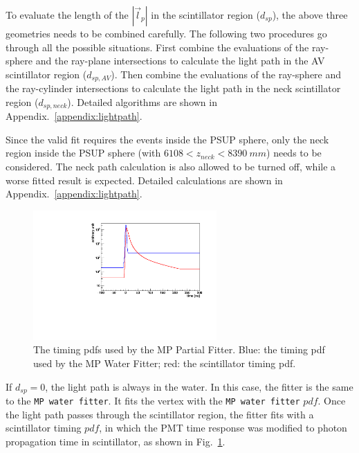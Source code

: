 To evaluate the length of the $|\vec{l}_p|$ in the scintillator region ($d_{sp}$), the above three geometries needs to be combined carefully. The following two procedures go through all the possible situations. First combine the evaluations of the ray-sphere and the ray-plane intersections to calculate the light path in the AV scintillator region ($d_{sp,AV}$). Then combine the evaluations of the ray-sphere and the ray-cylinder intersections to calculate the light path in the neck scintillator region ($d_{sp,neck}$). Detailed algorithms are shown in Appendix.~\ref{appendix:lightpath}.

Since the valid fit requires the events inside the PSUP sphere, only the neck region inside the PSUP sphere (with $6108<z_{neck}<8390~mm$) needs to be considered. The neck path calculation is also allowed to be turned off, while a worse fitted result is expected. Detailed calculations are shown in Appendix.~\ref{appendix:lightpath}.

\begin{figure}[htbp]
	\centering	
	\includegraphics[width=7cm]{scintpdf.pdf}
	\caption{The timing pdfs used by the MP Partial Fitter. Blue: the timing pdf used by the MP Water Fitter; red: the scintillator timing pdf.}
	\label{partialpdf}
\end{figure}

If $d_{sp}=0$, the light path is always in the water. In this case, the fitter is the same to the \texttt{MP water fitter}. It fits the vertex with the \texttt{MP water fitter} $pdf$. Once the light path passes through the scintillator region, the fitter fits with a scintillator timing $pdf$, in which the PMT time response was modified to photon propagation time in scintillator, as shown in Fig.~\ref{partialpdf}.


